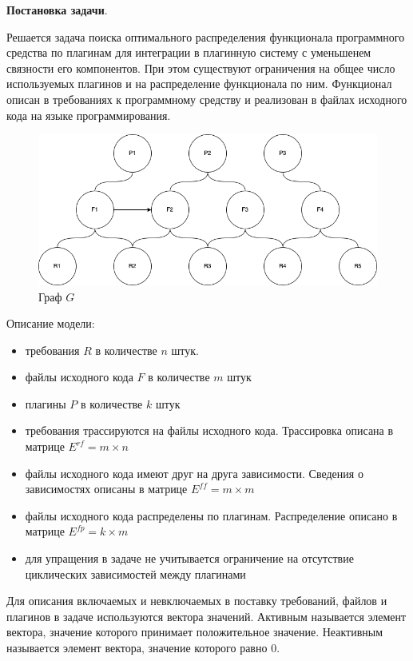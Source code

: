 \documentclass{article}
\begin{document}
  \textbf{Постановка задачи}.

  Решается задача поиска оптимального распределения функционала программного средства по плагинам для интеграции в плагинную систему с уменьшенем связности его компонентов. При этом существуют ограничения на общее число используемых плагинов и на распределение функционала по ним. Функционал описан в требованиях к программному средству и реализован в файлах исходного кода на языке программирования.

  \begin{figure}[H]
      \centering
      \includegraphics[width=1\textwidth]{graph.drawio}
      \caption{Граф $G$}
  \end{figure}

  Описание модели:
  \begin{itemize}
    \item требования $R$ в количестве $n$ штук.
    \item файлы исходного кода $F$ в количестве $m$ штук
    \item плагины $P$ в количестве $k$ штук
    \item требования трассируются на файлы исходного кода. Трассировка описана в матрице $E^{rf} = m \times n$
    \item файлы исходного кода имеют друг на друга зависимости. Сведения о зависимостях описаны в матрице $E^{ff} = m \times m$
    \item файлы исходного кода распределены по плагинам. Распределение описано в матрице $E^{fp} = k \times m$
    \item для упращения в задаче не учитывается ограничение на отсутствие циклических зависимостей между плагинами
  \end{itemize}

  Для описания включаемых и невключаемых в поставку требований, файлов и плагинов в задаче используются вектора значений. Активным называется элемент вектора, значение которого принимает положительное значение. Неактивным называется элемент вектора, значение которого равно $0$.
\end{document}
